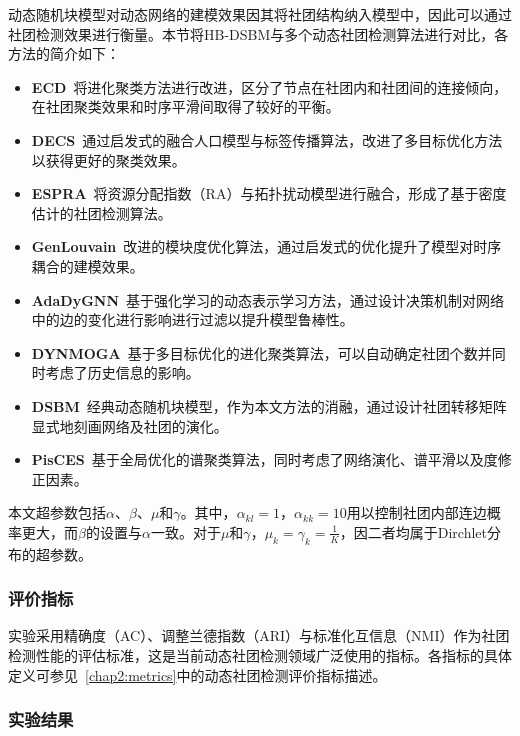动态随机块模型对动态网络的建模效果因其将社团结构纳入模型中，因此可以通过社团检测效果进行衡量。本节将HB-DSBM与多个动态社团检测算法进行对比，各方法的简介如下：
\begin{itemize}
	\item \textbf{ECD}~\cite{liu2019evolutionary}将进化聚类方法进行改进，区分了节点在社团内和社团间的连接倾向，在社团聚类效果和时序平滑间取得了较好的平衡。
	\item \textbf{DECS}~\cite{liu2020detecting}通过启发式的融合人口模型与标签传播算法，改进了多目标优化方法以获得更好的聚类效果。
	\item \textbf{ESPRA}~\cite{wang2017dynamic}将资源分配指数（RA）与拓扑扰动模型进行融合，形成了基于密度估计的社团检测算法。
	\item \textbf{GenLouvain}~\cite{jutla2011generalized}改进的模块度优化算法，通过启发式的优化提升了模型对时序耦合的建模效果。
	\item \textbf{AdaDyGNN}~\cite{Li2024DyGNN}基于强化学习的动态表示学习方法，通过设计决策机制对网络中的边的变化进行影响进行过滤以提升模型鲁棒性。
	\item \textbf{DYNMOGA}~\cite{folino2014evolutionary}基于多目标优化的进化聚类算法，可以自动确定社团个数并同时考虑了历史信息的影响。
	\item \textbf{DSBM}~\cite{yang2011detecting}经典动态随机块模型，作为本文方法的消融，通过设计社团转移矩阵显式地刻画网络及社团的演化。
	\item \textbf{PisCES}~\cite{liu2018global}基于全局优化的谱聚类算法，同时考虑了网络演化、谱平滑以及度修正因素。
\end{itemize}

本文超参数包括$\alpha$、$\beta$、$\mu$和$\gamma$。其中，$\alpha_{kl} = 1$，$\alpha_{kk} = 10$用以控制社团内部连边概率更大，而$\beta$的设置与$\alpha$一致。对于$\mu$和$\gamma$，$\mu_k = \gamma_k = \frac{1}{K}$，因二者均属于Dirchlet分布的超参数。

\subsubsection{评价指标}

实验采用精确度（AC）、调整兰德指数（ARI）与标准化互信息（NMI）作为社团检测性能的评估标准，这是当前动态社团检测领域广泛使用的指标。各指标的具体定义可参见~\ref{chap2:metrics}中的动态社团检测评价指标描述。

\subsubsection{实验结果}

